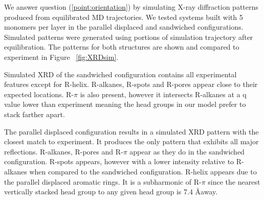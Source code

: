 \documentclass{article}
\begin{document}
  We answer question (\ref{point:orientation}) by simulating X-ray diffraction
  patterns produced from equilibrated MD trajectories. We tested systems built
  with 5 monomers per layer in the parallel displaced and sandwiched
  configurations. Simulated patterns were generated using portions of simulation
  trajectory after equilibration. The patterns for both structures are shown and
  compared to experiment in Figure ~\ref{fig:XRDsim}.

  Simulated XRD of the sandwiched configuration contains all experimental
  features except for R-helix. R-alkanes, R-spots and R-pores appear close to their
  expected locations. R-$\pi$ is also present, however it intersects R-alkanes at
  a q value lower than experiment meaning the head groups in our model prefer 
  to stack farther apart. 

  The parallel displaced configuration results in a simulated XRD pattern with
  the closest match to experiment. It produces the only pattern that exhibits
  all major reflections. R-alkanes, R-pores and R-$\pi$ appear as they do in the
  sandwiched configuration. R-spots appears, however with a lower intensity
  relative to R-alkanes when compared to the sandwiched configuration. R-helix
  appears due to the parallel displaced aromatic rings. It is a subharmonic
  of R-$\pi$ since the nearest vertically stacked head group to any given head
  group is 7.4 \AA away. 
\end{document}
